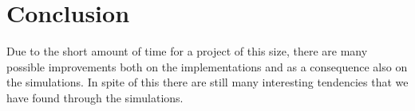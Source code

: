 \chapter{Conclusion}

Due to the short amount of time for a project of this size, there are many possible improvements both on the implementations and as a consequence also on the simulations. In spite of this there are still many interesting tendencies that we have found through the simulations.